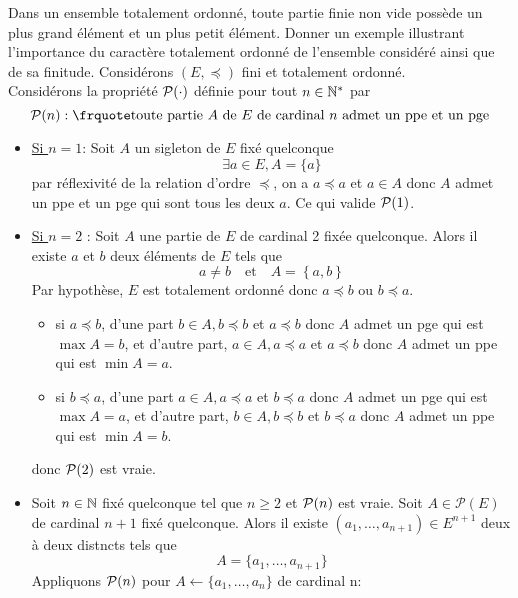 \documentclass{article}
\begin{document}
\begin{question_kholle}
\end{question_kholle}

\begin{question_kholle}{Dans un ensemble totalement ordonné, toute partie finie non vide possède un plus grand élément et un plus petit élément. Donner un exemple illustrant l’importance du caractère totalement ordonné de l’ensemble considéré ainsi que de sa finitude.}
  Considérons $(E,\preccurlyeq)$ fini et totalement ordonné.\\
  Considérons la propriété $\mathcal P(\cdot)$ définie pour tout $n\in\mathbb N^{*}$ par
  \[
    \prop(n) : \mathquote{toute partie $A$ de $E$ de cardinal $n$ admet un ppe et un pge}
  \]
  \begin{itemize}
    \item \underline{Si $n=1$}: Soit $A$ un sigleton de $E$ fixé quelconque
          \[
            \exists a\in E, A=\{a\}
          \]
          par réflexivité de la relation d’ordre $\preccurlyeq$, on a $a\preccurlyeq a$ et $a\in A$ donc $A$ admet un ppe et un pge qui sont tous les deux $a$. Ce qui valide $\mathcal P(1)$.
    \item \underline{Si $n=2$} : Soit $A$ une partie de $E$ de cardinal 2 fixée quelconque. Alors il existe $a$ et $b$ deux éléments de $E$ tels que
          \[
            a\neq b \quad \text{et} \quad A=\left\{a,b\right\}
          \]
          Par hypothèse, $E$ est totalement ordonné donc $a\preccurlyeq b$ ou $b\preccurlyeq a$.
          \begin{itemize}
            \item si $a\preccurlyeq b$, d’une part $b\in A, b\preccurlyeq b$ et $a\preccurlyeq b$ donc $A$ admet un pge qui est $\max A = b$, et d’autre part, $a\in A, a\preccurlyeq a$ et $a\preccurlyeq b$ donc $A$ admet un ppe qui est $\min A=a$.
            \item si $b\preccurlyeq a$, d’une part $a\in A, a\preccurlyeq a$ et $b\preccurlyeq a$ donc $A$ admet un pge qui est $\max A = a$, et d’autre part, $b\in A, b\preccurlyeq b$ et $b\preccurlyeq a$ donc $A$ admet un ppe qui est $\min A=b$.
          \end{itemize}
          donc $\mathcal P(2)$ est vraie.
    \item Soit $n\in\mathbb N$ fixé quelconque tel que $n\geq 2$ et $\mathcal P(n)$ est vraie. Soit $A\in\mathcal{P}(E)$  de cardinal $n+1$ fixé quelconque. Alors il existe $(a_{1}, \dots, a_{n+1})\in E^{n+1}$ deux à deux distncts tels que
          \[
            A=\{a_{1}, \dots, a_{n+1}\}
          \]
          Appliquons $\mathcal P(n)$ pour $A\leftarrow \{a_{1}, \dots, a_{n}\}$ de cardinal n:

\end{itemize}
\end{question_kholle}
\end{document}
